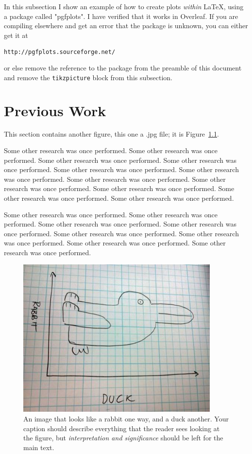 \documentclass[11pt]{ucscthesisbs}
\begin{document}
In this subsection I show an example of how to create plots {\it within} LaTeX, using a package called "pgfplots".  I have verified that it works in Overleaf.  If you are compiling elsewhere and get an error that the package is unknown, you can either get it at 
\begin{center}
{\tt http://pgfplots.sourceforge.net/}
\end{center}
or else remove the reference to the package from the preamble of this document and remove the {\tt tikzpicture} block from this subsection.



\chapter{Previous Work}

This section contains another figure, this one a .jpg file; it is Figure~\ref{fig:jpgfile}.

Some other research was once performed.
Some other research was once performed.
Some other research was once performed.
Some other research was once performed.
Some other research was once performed.
Some other research was once performed.
Some other research was once performed.
Some other research was once performed.
Some other research was once performed.
Some other research was once performed.
Some other research was once performed.

Some other research was once performed.
Some other research was once performed.
Some other research was once performed.
Some other research was once performed.
Some other research was once performed.
Some other research was once performed.
Some other research was once performed.
Some other research was once performed.

\begin{figure}[t!]
 \centerline{
  \includegraphics[width=4.0in]{rabbit-or-duck.jpg}
 }
\caption[Rabbit or duck?]
{An image that looks like a rabbit one way, and a duck another.  Your caption should describe everything that the reader sees looking at the figure, but {\it interpretation and significance} should be left for the main text.
}
\label{fig:jpgfile}
\end{figure}
\end{document}
